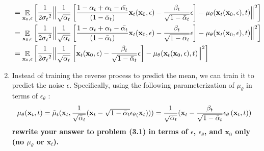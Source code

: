 \documentclass{article}
\DeclareMathOperator{\EX}{\mathbb{E}}%
\begin{document}
\begin{enumerate}
{\begin{align*}
    &= \EX_{\textbf{x}_0, \epsilon}\left[\frac{1}{2{\sigma_t}^2}
    \Big\lVert \frac{1}{\sqrt{\alpha_t}}\left[\frac{1 - \alpha_t + \alpha_t - \Bar{\alpha_t}}{(1 - \Bar{\alpha}_t)}\textbf{x}_t(\textbf{x}_0, \epsilon) - \frac{\beta_t}{\sqrt{1 - \Bar{\alpha}_t}}\epsilon\right] - {\mu_\theta}(\textbf{x}_t(\textbf{x}_0, \epsilon), t)\Big\rVert^2\right]\\
    &= \EX_{\textbf{x}_0, \epsilon}\left[\frac{1}{2{\sigma_t}^2}
    \Big\lVert \frac{1}{\sqrt{\alpha_t}}\left[\frac{1 - \alpha_t + \alpha_t - \Bar{\alpha_t}}{(1 - \Bar{\alpha}_t)}\textbf{x}_t(\textbf{x}_0, \epsilon) - \frac{\beta_t}{\sqrt{1 - \Bar{\alpha}_t}}\epsilon\right] - {\mu_\theta}(\textbf{x}_t(\textbf{x}_0, \epsilon), t)\Big\rVert^2\right]\\
    &= \EX_{\textbf{x}_0, \epsilon}\left[\frac{1}{2{\sigma_t}^2}
    \Big\lVert \frac{1}{\sqrt{\alpha_t}}\left[\textbf{x}_t(\textbf{x}_0, \epsilon) - \frac{\beta_t}{\sqrt{1 - \Bar{\alpha}_t}}\epsilon\right] - {\mu_\theta}(\textbf{x}_t(\textbf{x}_0, \epsilon), t)\Big\rVert^2\right]\\
    \end{align*}
}
    \item 
    Instead of training the reverse process to predict the mean, we can train it to predict the noise $\epsilon$. Specifically, using the following parameterization of $\mu_\theta$ in terms of $\epsilon_\theta$ :
    \begin{equation}
        {\mu_\theta}(\textbf{x}_t, t) = {{\Tilde\mu}_t}(\textbf{x}_t, \frac{1}{\sqrt{{\bar\alpha}_t}}(\textbf{x}_t - \sqrt{1 - {\bar\alpha}_t}{\epsilon_\theta}_(\textbf{x}_t))) = \frac{1}{\sqrt{\alpha_t}}(\textbf{x}_t - \frac{\beta_t}{\sqrt{1 - {\bar\alpha}_t}}{\epsilon_\theta}\left(\textbf{x}_t, t)\right)
    \end{equation}
    \textbf{rewrite your answer to problem (3.1) in terms of  $\epsilon$, $\epsilon_\theta$, and $\textbf{x}_0$ only (no $\mu_\theta$ or $\textbf{x}_t$).}


\end{enumerate}
\end{document}

